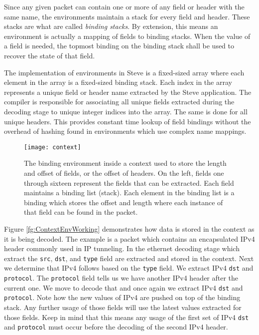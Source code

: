Since any given packet can contain one or more of any field or header with the same name, the environments maintain a stack for every field and header. These stacks are what are called \textit{binding stacks}. By extension, this means an environment is actually a mapping of fields to binding stacks. When the value of a field is needed, the topmost binding on the binding stack shall be used to recover the state of that field.

The implementation of environments in Steve is a fixed-sized array where each element in the array is a fixed-sized binding stack. Each index in the array represents a unique field or header name extracted by the Steve application. The compiler is responsible for associating all unique fields extracted during the decoding stage to unique integer indices into the array. The same is done for all unique headers. This provides constant time lookup of field bindings without the overhead of hashing found in environments which use complex name mappings.

\begin{figure}
\centering
		\texttt{[image: context]}
\caption{The binding environment inside a context used to store the length and offset of fields, or the offset of headers. On the left, fields one through sixteen represent the fields that can be extracted. Each field maintains a binding list (stack). Each element in the binding list is a binding which stores the offset and length where each instance of that field can be found in the packet. }
\label{fg:ContextEnv}
\end{figure}

Figure \ref{fg:ContextEnvWorking} demonstrates how data is stored in the context as it is being decoded. The example is a packet which contains an encapsulated IPv4 header commonly used in IP tunneling. In the ethernet decoding stage which extract the \texttt{src}, \texttt{dst}, and \texttt{type} field are extracted and stored in the context. Next we determine that IPv4 follows based on the \texttt{type} field. We extract IPv4 \texttt{dst} and \texttt{protocol}. The \texttt{protocol} field tells us we have another IPv4 header after the current one. We move to decode that and once again we extract IPv4 \texttt{dst} and \texttt{protocol}. Note how the new values of IPv4 are pushed on top of the binding stack. Any further usage of those fields will use the latest values extracted for those fields. Keep in mind that this means any usage of the first set of IPv4 \texttt{dst} and \texttt{protocol} must occur before the decoding of the second IPv4 header.

